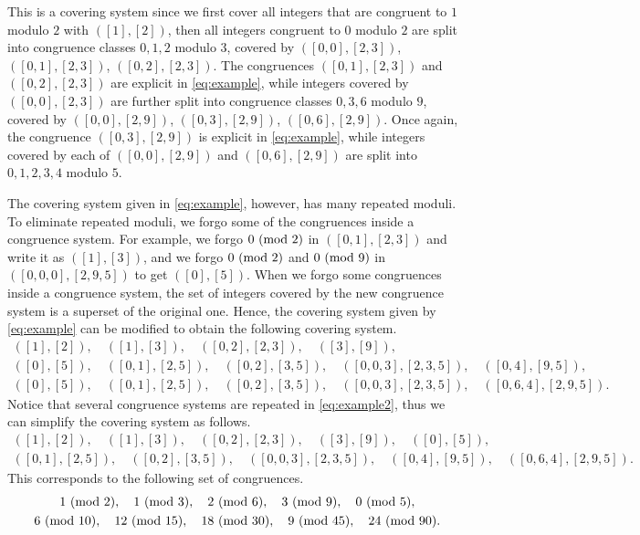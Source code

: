 \documentclass[12pt]{article}
\theoremstyle{definition}
\renewcommand{\mod}[2]{#1\textup{ (mod }#2\textup{)}}
\begin{document}
This is a covering system since we first cover all integers that are congruent to $1$ modulo $2$ with $([1],[2])$, then all integers congruent to $0$ modulo $2$ are split into congruence classes $0,1,2$ modulo $3$, covered by $([0,0],[2,3])$, $([0,1],[2,3])$, $([0,2],[2,3])$. The congruences $([0,1],[2,3])$ and $([0,2],[2,3])$ are explicit in \eqref{eq:example}, while integers covered by $([0,0],[2,3])$ are further split into congruence classes $0,3,6$ modulo $9$, covered by $([0,0],[2,9])$, $([0,3],[2,9])$, $([0,6],[2,9])$. Once again, the congruence $([0,3],[2,9])$ is explicit in \eqref{eq:example}, while integers covered by each of $([0,0],[2,9])$ and $([0,6],[2,9])$ are split into $0,1,2,3,4$ modulo $5$.

The covering system given in \eqref{eq:example}, however, has many repeated moduli. To eliminate repeated moduli, we forgo some of the congruences inside a congruence system. For example, we forgo $\mod{0}{2}$ in $([0,1],[2,3])$ and write it as $([1],[3])$, and we forgo $\mod{0}{2}$ and $\mod{0}{9}$ in $([0,0,0],[2,9,5])$ to get $([0],[5])$. When we forgo some congruences inside a congruence system, the set of integers covered by the new congruence system is a superset of the original one. Hence, the covering system given by \eqref{eq:example} can be modified to obtain the following covering system.
\begin{equation}\label{eq:example2}\begin{gathered}
([1],[2]),\quad ([1],[3]),\quad ([0,2],[2,3]),\quad ([3],[9]),\\
([0],[5]),\quad ([0,1],[2,5]),\quad ([0,2],[3,5]),\quad ([0,0,3],[2,3,5]),\quad ([0,4],[9,5]),\\
([0],[5]),\quad ([0,1],[2,5]),\quad ([0,2],[3,5]),\quad ([0,0,3],[2,3,5]),\quad ([0,6,4],[2,9,5]).
\end{gathered}\end{equation}
Notice that several congruence systems are repeated in \eqref{eq:example2}, thus we can simplify the covering system as follows.
\begin{equation*}\label{eq:example3}\begin{gathered}
([1],[2]),\quad ([1],[3]),\quad ([0,2],[2,3]),\quad ([3],[9]),\quad ([0],[5]),\\
([0,1],[2,5]),\quad ([0,2],[3,5]),\quad ([0,0,3],[2,3,5]),\quad ([0,4],[9,5]),\quad ([0,6,4],[2,9,5]).
\end{gathered}\end{equation*}
This corresponds to the following set of congruences.%
\begin{equation}\label{eq:example4}
\begin{gathered}
\mod{1}{2},\quad \mod{1}{3},\quad \mod{2}{6},\quad \mod{3}{9},\quad \mod{0}{5},\\
\mod{6}{10},\quad \mod{12}{15},\quad \mod{18}{30},\quad \mod{9}{45},\quad \mod{24}{90}.
\end{gathered}\end{equation}
\end{document}
